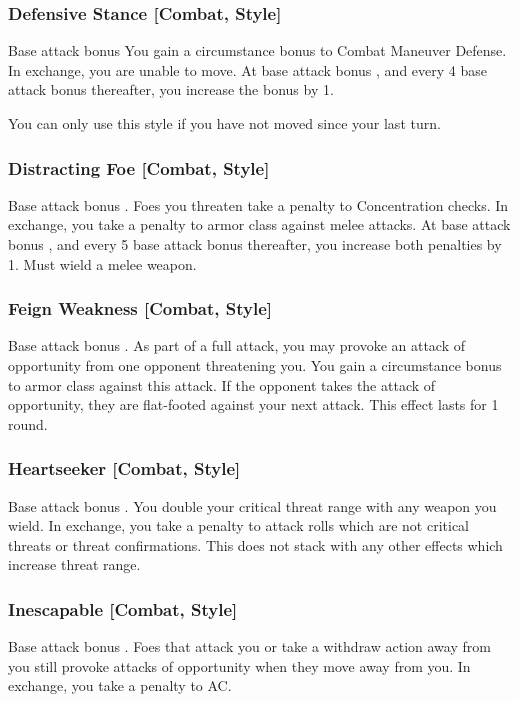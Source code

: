 \subsubsection{Defensive Stance [Combat, Style]}
 Base attack bonus 
 You gain a  circumstance bonus to Combat Maneuver Defense. In exchange, you are unable to move. At base attack bonus , and every 4 base attack bonus thereafter, you increase the bonus by 1.

You can only use this style if you have not moved since your last turn.

\subsubsection{Distracting Foe [Combat, Style]}
 Base attack bonus .
 Foes you threaten take a  penalty to Concentration checks. In exchange, you take a  penalty to armor class against melee attacks. At base attack bonus , and every 5 base attack bonus thereafter, you increase both penalties by 1.
 Must wield a melee weapon.

\subsubsection{Feign Weakness [Combat, Style]}
\featpre Base attack bonus .
\featben As part of a full attack, you may provoke an attack of opportunity from one opponent threatening you. You gain a  circumstance bonus to armor class against this attack. If the opponent takes the attack of opportunity, they are flat-footed against your next attack. This effect lasts for 1 round.

\subsubsection{Heartseeker [Combat, Style]}
 Base attack bonus .
 You double your critical threat range with any weapon you wield. In exchange, you take a  penalty to attack rolls which are not critical threats or threat confirmations. This does not stack with any other effects which increase threat range.

\subsubsection{Inescapable [Combat, Style]}
\featpre Base attack bonus .
\featben Foes that attack you or take a withdraw action away from you still provoke attacks of opportunity when they move away from you. In exchange, you take a  penalty to AC.

